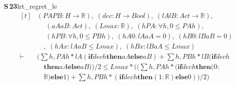 \documentclass[conference]{IEEEtran}
\theoremstyle{definition}
\newcommand{\lean}[1]{\textsf{\footnotesize #1}}
\begin{document}
\noindent\textbf{S\,23}\quad\lean{lrt\_regret\_le}
{\footnotesize\[ \begin{aligned}[t]
&(\mathit{PA} \mathit{PB} : \mathit{H} \to \mathbb{R} ),\; (\mathit{dec} : \mathit{H} \to \mathit{Bool}),\; (\mathit{lA} \mathit{lB} : \mathit{Act} \to \mathbb{R} ),\\
&\quad \; (\mathit{aA} \mathit{aB} : \mathit{Act}),\; (\mathit{Lmax} : \mathbb{R} ),\; (\mathit{hPA} : \forall \mathit{h}, 0 \leq \mathit{PA} \mathit{h}),\\
&\quad \; (\mathit{hPB} : \forall \mathit{h}, 0 \leq \mathit{PB} \mathit{h}),\; (\mathit{hA0} : \mathit{lA} \mathit{aA} = 0),\; (\mathit{hB0} : \mathit{lB} \mathit{aB} = 0)\\
&\quad ,\; (\mathit{hAx} : \mathit{lA} \mathit{aB} \leq \mathit{Lmax}),\; (\mathit{hBx} : \mathit{lB} \mathit{aA} \leq \mathit{Lmax})\\
\vdash\;&(\textstyle\sum \mathit{h}, \mathit{PA} \mathit{h} * \mathit{lA} (\mathbf{if} \mathit{dec} \mathit{h} \mathbf{then} \mathit{aA} \mathbf{else} \mathit{aB}) + \textstyle\sum \mathit{h}, \mathit{PB} \mathit{h} * \mathit{lB} (\mathbf{if} \mathit{dec} \mathit{h}\\
&\quad \mathbf{then} \mathit{aA} \mathbf{else} \mathit{aB})) / 2 \leq \mathit{Lmax} * ((\textstyle\sum \mathit{h}, \mathit{PA} \mathit{h} * (\mathbf{if} \mathit{dec} \mathit{h} \mathbf{then} (0:\\
&\quad \mathbb{R} ) \mathbf{else} 1) + \textstyle\sum \mathit{h}, \mathit{PB} \mathit{h} * (\mathbf{if} \mathit{dec} \mathit{h} \mathbf{then} (1:\mathbb{R} ) \mathbf{else} 0)) / 2)
\end{aligned} \]}
\end{document}
